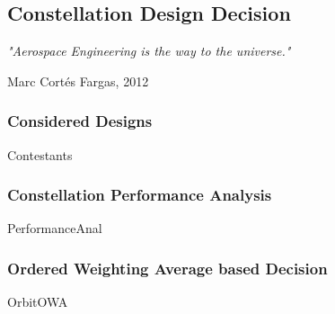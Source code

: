 \subsection{Constellation Design Decision}

\epigraph{\textit{"Aerospace Engineering is the way to the universe."}}{Marc Cortés Fargas, 2012} 

\subsubsection{Considered Designs}
{Contestants}

\subsubsection{Constellation Performance Analysis}
{PerformanceAnal}

\subsubsection{Ordered Weighting Average based Decision}
{OrbitOWA}
